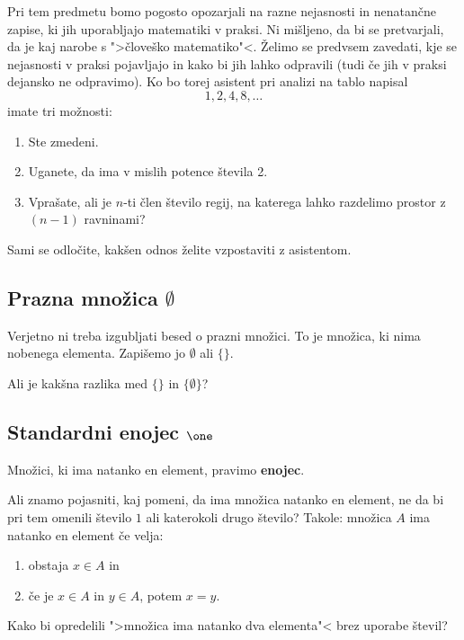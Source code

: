 Pri tem predmetu bomo pogosto opozarjali na razne nejasnosti in nenatančne zapise, ki jih uporabljajo matematiki v praksi.
Ni mišljeno, da bi se pretvarjali, da je kaj narobe s ">človeško matematiko"<. Želimo se predvsem zavedati, kje se nejasnosti v praksi pojavljajo in kako bi jih lahko odpravili (tudi če jih v praksi dejansko ne odpravimo). Ko bo torej asistent pri analizi na tablo napisal
%
\begin{equation*}
    1, 2, 4, 8, \ldots
\end{equation*}
imate tri možnosti:
%
\begin{enumerate}
  \item Ste zmedeni.
  \item Uganete, da ima v mislih potence števila 2.
  \item Vprašate, ali je $n$-ti člen število regij, na katerega lahko razdelimo prostor z $(n-1)$ ravninami?
\end{enumerate}
%
Sami se odločite, kakšen odnos želite vzpostaviti z asistentom.

\subsection{Prazna množica $\emptyset$}

Verjetno ni treba izgubljati besed o prazni množici. To je množica, ki nima nobenega elementa. Zapišemo jo $\emptyset$ ali $\{\}$.

\begin{naloga}
  Ali je kakšna razlika med $\{\}$ in $\{\emptyset\}$?
\end{naloga}


\subsection{Standardni enojec $\one$}

Množici, ki ima natanko en element, pravimo \textbf{enojec}.

Ali znamo pojasniti, kaj pomeni, da ima množica natanko en element, ne da bi pri tem omenili število $1$ ali katerokoli drugo število? Takole: množica $A$ ima natanko en element če velja:
%
\begin{enumerate}
\item obstaja $x \in A$ in
\item če je $x \in A$ in $y \in A$, potem $x = y$.
\end{enumerate}

\begin{naloga}
  Kako bi opredelili ">množica ima natanko dva elementa"< brez uporabe števil?
\end{naloga}

